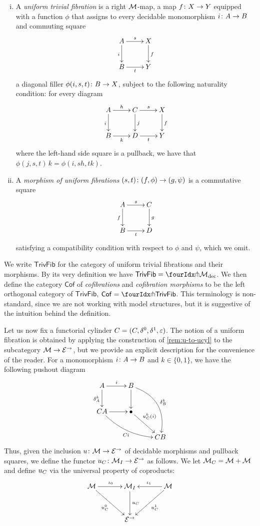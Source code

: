 \documentclass[reqno,10pt,a4paper,oneside]{amsart}
\begin{document}
\begin{definition} \hfill
\begin{enumerate}[(i)]
\item A \emph{uniform trivial  fibration} is a right $\cal{M}$-map, \ie a map
$f  \co X \to Y$ equipped with a function $\phi$
that assigns to every decidable monomorphism $i \co A \to B$ and commuting square 
 \[
 \xymatrix{
 A \ar[r]^s \ar[d]_i & X \ar[d]^f \\
 B \ar[r]_t & Y}
 \]
a diagonal filler $\phi(i, s, t) \co B \to X$, subject to the following naturality condition: for every 
diagram 
\[
\xymatrix{
A \ar[r]^{h} \ar[d]_{i} & C \ar[d]^{j}  \ar[r]^s & X \ar[d]^f \\
B \ar[r]_{k} & D \ar[r]_t & Y }
\]
where the left-hand side square is a pullback, we have that $\phi(j, s, t) \, k = \phi(i, s  h, t  k)$.
 \item A \emph{morphism of uniform  fibrations} $(s, t) \co (f, \phi) \to (g, \psi)$ is a commutative
 square
 \[
 \xymatrix{
  A \ar[d]_f \ar[r]^s & C \ar[d]^g \\
  B \ar[r]_{t}& D} 
  \]
  satisfying a compatibility condition with respect to $\phi$ and $\psi$, which we omit. 
\end{enumerate}
\end{definition}

We write $\mathsf{TrivFib}$ for the category of uniform trivial fibrations and their morphisms.
By its very definition we have $\mathsf{TrivFib} = \liftr{\cal{M}_{\textup{dec}}}$. We then define
the category $\mathsf{Cof}$ of \emph{cofibrations} and \emph{cofibration morphisms} to be the left orthogonal
category of $\mathsf{TrivFib}$, \ie $\mathsf{Cof} = \liftl{\mathsf{TrivFib}}$. This terminology is non-standard,
since we are not working with model structures, but it is suggestive of the intuition behind the definition.

\medskip

Let us now fix a functorial cylinder $\cyl = (\cyl, \lcyl, \rcyl, \ccyl)$. The notion of a uniform fibration is obtained by applying the construction of \cref{rem:u-to-ucyl} to the subcategory $\cal{M} \to \cal{E}^\to$, but we provide
an explicit description for the convenience of the reader. For a monomorphism $i \co A \to B$
and $k \in \{0 , 1\}$, we have the following pushout diagram
\[
\xymatrix{
 A \ar[r]^{i}  \ar[d]_{\delta^k_A} &  B \ar@/^2em/[ddr]^{\delta^k_B} \ar[d] & \\ 
\cyl A \ar@/_1em/[drr]_{\cyl i} \ar[r] & \bullet \ar[dr]^-(.35){u^k_\cyl(i)}  & \\ 
 & & \cyl B}
 \]
 Thus, given the inclusion $u \co \cal{M} \to \cal{E}^\to$ of decidable morphisms and pullback squares, 
 we define the functor $u_\cyl \co \cal{M}_{I} \to \cal{E}^\to$ as follows. 
We let $\cal{M}_\cyl = \cal{M} + \cal{M}$ and define $u_{\cyl}$ via the universal
 property of coproducts:
  \[
 \xymatrix@R=1.2cm@C=1.2cm{
 \cal{M} \ar[dr]_-{u^0_\cyl}  \ar[r]^{\iota_0} &  \cal{M}_{I} \ar[d]^{u_{\cyl}} & \cal{M} \ar[dl]^-{u_\cyl^1} \ar[l]_{\iota_1} \\
  & \cal{E}^\to & }
  \]
 
\end{document}
